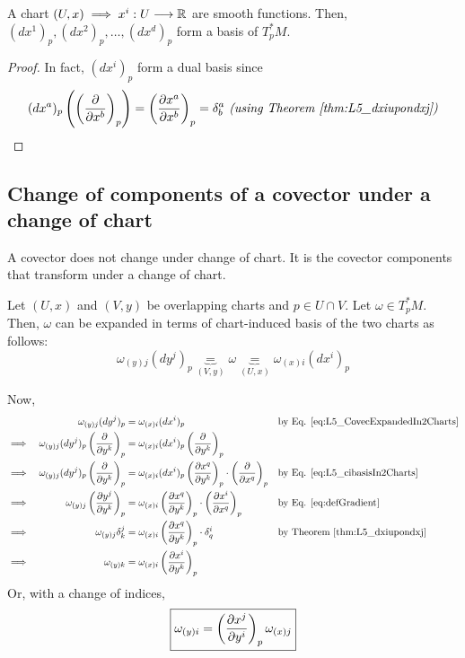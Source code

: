 \begin{theorem}
A chart $(U,x) \implies x^i : U \to \R$ are smooth functions. Then, $(dx^1)_p, (dx^2)_p, \dotsc, (dx^d)_p$ form a basis of $T_p^*M$. 
\end{theorem}

\begin{proof}
In fact, $(dx^i)_p$ form a dual basis since 
\begin{equation}
(dx^a)_p \left(\left(\cibasis{x^b}\right)_p \right) = \left(\cibasis[x^a]{x^b}\right)_p = \delta_b^a \textit{ (using Theorem \ref{thm:L5_dxiupondxj})}
\end{equation}
\end{proof}

\subsection{Change of components of a covector under a change of chart}
 A covector does not change under change of chart. It is the covector components that transform under a change of chart.

Let $(U,x)$ and $(V,y)$ be overlapping charts and $p \in U \cap V$. Let $\omega \in T_p^*M$. Then, $\omega$ can be expanded in terms of chart-induced basis of the two charts as follows:
\begin{equation}\label{eq:L5_CovecExpandedIn2Charts}
\displaystyle\omega_{(y)j}(dy^j)_p \underbrace{=}_{(V,y)} \omega \underbrace{=}_{(U,x)} \omega_{(x)i}(dx^i)_p
\end{equation}

Now,
\begin{align*}
  && \displaystyle\omega_{(y)j}(dy^j)_p & = \omega_{(x)i}(dx^i)_p && \text{by Eq. \ref{eq:L5_CovecExpandedIn2Charts}} \\
  \implies && \displaystyle\omega_{(y)j}(dy^j)_p \left(\cibasis{y^k}\right)_p & = \omega_{(x)i}(dx^i)_p \left(\cibasis{y^k}\right)_p \\
  \implies && \displaystyle\omega_{(y)j}(dy^j)_p \left(\cibasis{y^k}\right)_p & = \omega_{(x)i}(dx^i)_p \left(\cibasis[x^q]{y^k}\right)_p \cdot \left(\cibasis{x^q}\right)_p && \text{by Eq. \ref{eq:L5_cibasisIn2Charts}} \\
  \implies && \displaystyle\omega_{(y)j} \left(\cibasis[y^j]{y^k}\right)_p & = \omega_{(x)i} \left(\cibasis[x^q]{y^k}\right)_p \cdot \left(\cibasis[x^i]{x^q}\right)_p && \text{by Eq. \ref{eq:defGradient}} \\
  \implies && \displaystyle\omega_{(y)j} \delta^j_k & = \omega_{(x)i} \left(\cibasis[x^q]{y^k}\right)_p \cdot \delta^i_q && \text{by Theorem \ref{thm:L5_dxiupondxj}} \\
  \implies && \displaystyle\omega_{(y)k} & = \omega_{(x)i} \left(\cibasis[x^i]{y^k}\right)_p
\end{align*}
Or, with a change of indices,
\begin{equation}
\boxed{\omega_{(y)i} = \left(\cibasis[x^j]{y^i}\right)_p \omega_{(x)j}}
\end{equation}

